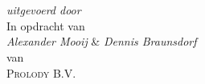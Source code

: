 \begin{titlepage}
  \vspace*{5cm}
  \makeatletter
  \begin{center}
    \begin{Huge}
      \@title
    \end{Huge}\\[0.1cm]
    \begin{Large}
      \@subtitle
    \end{Large}\\
    \emph{uitgevoerd door}\\
    \@author
    \vfill
    In opdracht van\\
    \emph{Alexander Mooij} \& \emph{Dennis Braunsdorf} \\
    van \\
    \textsc{Prolody B.V.}
  \end{center}
  \makeatother
\end{titlepage}

\newpage
\null
\thispagestyle{empty}
\newpage

